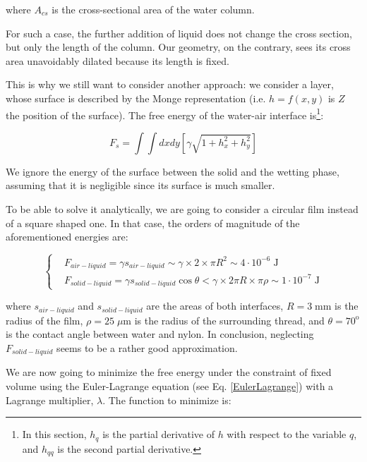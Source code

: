 where $A_{cs}$ is the cross-sectional area of the water column.

For such a case, the further addition of liquid does not change the cross section, but only the length of the column. Our geometry, on the contrary, sees its cross area unavoidably dilated because its length is fixed.

This is why we still want to consider another approach: we consider a layer, whose surface is described by the Monge representation (i.e. $h=f(x,y)$ is $Z$ the position of the surface). The free energy of the water-air interface is\footnote{In this section, $h_q$ is the partial derivative of $h$ with respect to the variable $q$, and $h_{qq}$ is the second partial derivative.}:

\begin{equation}
F_{s}=\int \int d x d y\left[\gamma \sqrt{1+h_{x}^{2}+h_{y}^{2}}\right]
\end{equation}

We ignore the energy of the surface between the solid and the wetting phase, assuming that it is negligible since its surface is much smaller. 

To be able to solve it analytically, we are going to consider a circular film instead of a square shaped one. In that case, the orders of magnitude of the aforementioned energies are: 

\begin{equation}
\left\{
\begin{aligned} & F_{air-liquid} = \gamma s_{air-liquid} \sim \gamma \times 2 \times \pi R^2 \sim 4 \cdot 10^{-6} \; \textrm{J} \\
& F_{solid-liquid} = \gamma s_{solid-liquid} \cos \theta  < \gamma \times 2 \pi R \times \pi \rho \sim 1 \cdot 10^{-7} \; \textrm{J}
\end{aligned}
\right.
\end{equation}

where $s_{air-liquid}$ and $s_{solid-liquid}$ are the areas of both interfaces, $R = 3 \; \textrm{mm}$ is the radius of the film, $\rho = 25 \; \mu \textrm{m}$ is the radius of the surrounding thread, and $\theta = 70^\textrm{o}$ is the contact angle between water and nylon. In conclusion, neglecting $F_{solid-liquid}$ seems to be a rather good approximation.

We are now going to minimize the free energy under the constraint of fixed volume using the Euler-Lagrange equation (see Eq. \ref{EulerLagrange}) with a Lagrange multiplier, $\lambda$. The function to minimize is:

